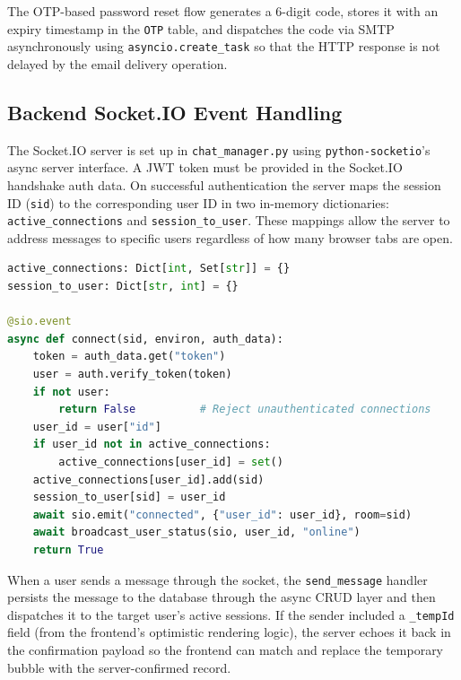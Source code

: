 \documentclass[12pt,a4paper,oneside]{report}
\begin{document}
The OTP-based password reset flow generates a 6-digit code, stores it with an
expiry timestamp in the \texttt{OTP} table, and dispatches the code via SMTP
asynchronously using \texttt{asyncio.create\_task} so that the HTTP response
is not delayed by the email delivery operation.

\subsection{Backend Socket.IO Event Handling}
\label{subsec:backend-event-handling}

The Socket.IO server is set up in \texttt{chat\_manager.py} using
\texttt{python-socketio}'s async server interface. A JWT token must be
provided in the Socket.IO handshake auth data. On successful authentication
the server maps the session ID (\texttt{sid}) to the corresponding user ID
in two in-memory dictionaries: \texttt{active\_connections} and
\texttt{session\_to\_user}. These mappings allow the server to address
messages to specific users regardless of how many browser tabs are open.

\begin{lstlisting}[language=Python, caption=Socket.IO Connection and Session Mapping (chat\_manager.py)]
active_connections: Dict[int, Set[str]] = {}
session_to_user: Dict[str, int] = {}

@sio.event
async def connect(sid, environ, auth_data):
    token = auth_data.get("token")
    user = auth.verify_token(token)
    if not user:
        return False          # Reject unauthenticated connections
    user_id = user["id"]
    if user_id not in active_connections:
        active_connections[user_id] = set()
    active_connections[user_id].add(sid)
    session_to_user[sid] = user_id
    await sio.emit("connected", {"user_id": user_id}, room=sid)
    await broadcast_user_status(sio, user_id, "online")
    return True
\end{lstlisting}

When a user sends a message through the socket, the \texttt{send\_message}
handler persists the message to the database through the async CRUD layer and
then dispatches it to the target user's active sessions. If the sender included
a \texttt{\_tempId} field (from the frontend's optimistic rendering logic), the
server echoes it back in the confirmation payload so the frontend can match and
replace the temporary bubble with the server-confirmed record.
\end{document}

